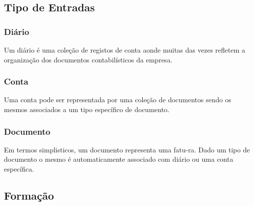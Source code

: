 \documentclass[sigplan]{acmart}
\begin{document}
\subsection{Tipo de Entradas}

\subsubsection{Diário}

Um diário é uma coleção de registos de conta aonde muitas das vezes refletem a organização dos documentos contabilísticos da empresa.

\subsubsection{Conta}

Uma conta pode ser representada por uma coleção de documentos sendo os mesmos associados a um tipo específico de documento.

\subsubsection{Documento}

Em termos simplisticos, um documento representa uma fatu-ra. Dado um tipo de documento o mesmo é automaticamente associado com diário ou uma conta específica.

\subsection{Formação}
\end{document}
